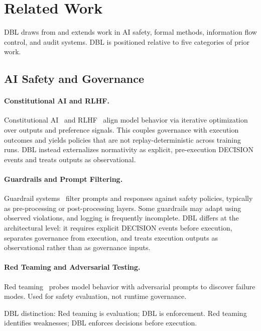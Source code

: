 \section{Related Work}

DBL draws from and extends work in AI safety, formal methods, information flow control, and audit systems. DBL is positioned relative to five categories of prior work.

\subsection{AI Safety and Governance}

\paragraph{Constitutional AI and RLHF.}
Constitutional AI~\cite{bai2022constitutional} and RLHF~\cite{ouyang2022training} align model behavior via iterative optimization over outputs and preference signals. This couples governance with execution outcomes and yields policies that are not replay-deterministic across training runs. DBL instead externalizes normativity as explicit, pre-execution DECISION events and treats outputs as observational.

\paragraph{Guardrails and Prompt Filtering.}
Guardrail systems~\cite{rebedea2023nemo,inan2023llama} filter prompts and responses against safety policies, typically as pre-processing or post-processing layers. Some guardrails may adapt using observed violations, and logging is frequently incomplete. DBL differs at the architectural level: it requires explicit DECISION events before execution, separates governance from execution, and treats execution outputs as observational rather than as governance inputs.

\paragraph{Red Teaming and Adversarial Testing.}
Red teaming~\cite{perez2022red,ganguli2022red} probes model behavior with adversarial prompts to discover failure modes. Used for safety evaluation, not runtime governance.

DBL distinction: Red teaming is evaluation; DBL is enforcement. Red teaming identifies weaknesses; DBL enforces decisions before execution.

